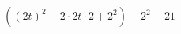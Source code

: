 \documentclass[preview]{standalone}
\begin{document}
\begin{align*}
\left(\left(2 t\right)^2-2\cdot 2 t\cdot 2+2^2\right)-2^2-21
\end{align*}
\end{document}
